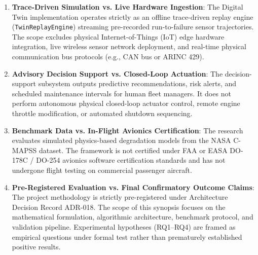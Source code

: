 \documentclass[12pt,a4paper]{article}
\begin{document}
\begin{enumerate}
    \item \textbf{Trace-Driven Simulation vs. Live Hardware Ingestion}: The Digital Twin implementation operates strictly as an offline trace-driven replay engine (\texttt{TwinReplayEngine}) streaming pre-recorded run-to-failure sensor trajectories. The scope excludes physical Internet-of-Things (IoT) edge hardware integration, live wireless sensor network deployment, and real-time physical communication bus protocols (e.g., CAN bus or ARINC 429).
    
    \item \textbf{Advisory Decision Support vs. Closed-Loop Actuation}: The decision-support subsystem outputs predictive recommendations, risk alerts, and scheduled maintenance intervals for human fleet managers. It does not perform autonomous physical closed-loop actuator control, remote engine throttle modification, or automated shutdown sequencing.
    
    \item \textbf{Benchmark Data vs. In-Flight Avionics Certification}: The research evaluates simulated physics-based degradation models from the NASA C-MAPSS dataset. The framework is not certified under FAA or EASA DO-178C / DO-254 avionics software certification standards and has not undergone flight testing on commercial passenger aircraft.
    
    \item \textbf{Pre-Registered Evaluation vs. Final Confirmatory Outcome Claims}: The project methodology is strictly pre-registered under Architecture Decision Record ADR-018. The scope of this synopsis focuses on the mathematical formulation, algorithmic architecture, benchmark protocol, and validation pipeline. Experimental hypotheses (RQ1--RQ4) are framed as empirical questions under formal test rather than prematurely established positive results.
\end{enumerate}
\end{document}
